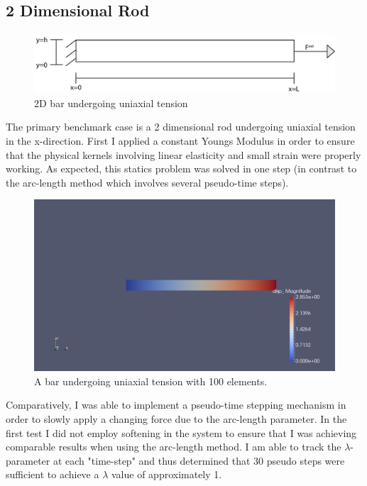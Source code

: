 \documentclass[10pt,a4paper]{article}
\begin{document}
	\subsection{2 Dimensional Rod}
	
\begin{figure}[h!]
	\centering
	\includegraphics[width=0.7\linewidth]{bar_uniaxial}
	\caption{2D bar undergoing uniaxial tension}
	\label{fig:baruniaxial}
\end{figure}
	The primary benchmark case is a 2 dimensional rod undergoing uniaxial tension in the x-direction. First I applied a constant Youngs Modulus in order to ensure that the physical kernels involving linear elasticity and small strain were properly working. As expected, this statics problem was solved in one step (in contrast to the arc-length method which involves several pseudo-time steps).
	
	
\begin{figure}[h!]
	\centering
	\includegraphics[width=0.7\linewidth]{2d_nolam}
	\caption{A bar undergoing uniaxial tension with 100 elements.}
	\label{fig:2dnolam}
\end{figure}


Comparatively, I was able to implement a pseudo-time stepping mechanism in order to slowly apply a changing force due to the arc-length parameter. In the first test I did not employ softening in the system to ensure that I was achieving comparable results when using the arc-length method. I am able to track the $\lambda$-parameter at each "time-step" and thus determined that 30 pseudo steps were sufficient to achieve a $\lambda$ value of approximately 1.
\end{document}
